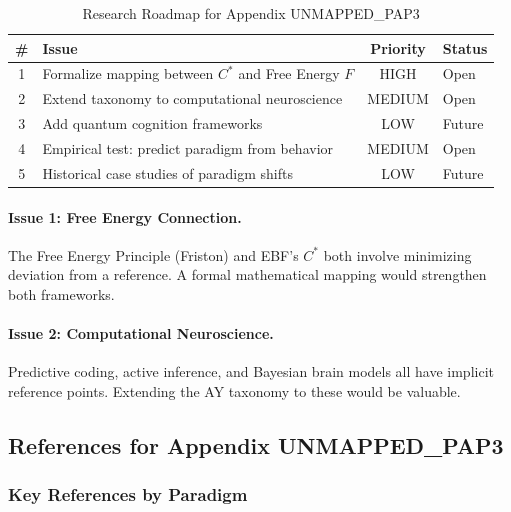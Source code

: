 \begin{table}[htbp]
\centering
\caption{Research Roadmap for Appendix UNMAPPED_PAP3}
\label{tab:AY-roadmap}
\renewcommand{\arraystretch}{1.3}
\begin{tabular}{@{}clcl@{}}
\toprule
\textbf{\#} & \textbf{Issue} & \textbf{Priority} & \textbf{Status} \\
\midrule
1 & Formalize mapping between $C^*$ and Free Energy $F$ & HIGH & Open \\
2 & Extend taxonomy to computational neuroscience & MEDIUM & Open \\
3 & Add quantum cognition frameworks & LOW & Future \\
4 & Empirical test: predict paradigm from behavior & MEDIUM & Open \\
5 & Historical case studies of paradigm shifts & LOW & Future \\
\bottomrule
\end{tabular}
\end{table}

\paragraph{Issue 1: Free Energy Connection.}
The Free Energy Principle (Friston) and EBF's $C^*$ both involve minimizing
deviation from a reference. A formal mathematical mapping would strengthen
both frameworks.

\paragraph{Issue 2: Computational Neuroscience.}
Predictive coding, active inference, and Bayesian brain models all have
implicit reference points. Extending the AY taxonomy to these would be valuable.


\subsection{References for Appendix UNMAPPED_PAP3}
\label{sec:AY-references}

\subsubsection{Key References by Paradigm}

